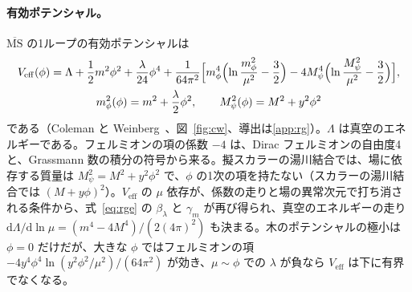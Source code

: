 \documentclass[a4paper,10pt]{ltjsarticle}
\newcommand{\dd}{\mathrm{d}}
\newcommand{\MSbar}{\overline{\mathrm{MS}}}
\begin{document}
\paragraph{有効ポテンシャル。}$\MSbar$ の1ループの有効ポテンシャルは
\begin{equation}
\begin{gathered}
V_{\mathrm{eff}}(\phi)=\Lambda+\frac12m^2\phi^2+\frac{\lambda}{24}\phi^4
+\frac{1}{64\pi^2}\Bigl[m_\phi^4\Bigl(\ln\frac{m_\phi^2}{\mu^2}-\frac32\Bigr)-4M_\psi^4\Bigl(\ln\frac{M_\psi^2}{\mu^2}-\frac32\Bigr)\Bigr],\\
m_\phi^2(\phi)=m^2+\frac{\lambda}{2}\phi^2,\qquad M_\psi^2(\phi)=M^2+y^2\phi^2
\end{gathered}
\label{eq:cw}
\end{equation}
である（Coleman と Weinberg~\cite{cw}、図~\ref{fig:cw}、導出は\ref{app:rg}）。$\Lambda$ は真空のエネルギーである。フェルミオンの項の係数 $-4$ は、Dirac フェルミオンの自由度4と、Grassmann 数の積分の符号から来る。擬スカラーの湯川結合では、場に依存する質量は $M_\psi^2=M^2+y^2\phi^2$ で、$\phi$ の1次の項を持たない（スカラーの湯川結合では $(M+y\phi)^2$）。$V_{\mathrm{eff}}$ の $\mu$ 依存が、係数の走りと場の異常次元で打ち消される条件から、式~\eqref{eq:rge} の $\beta_\lambda$ と $\gamma_m$ が再び得られ、真空のエネルギーの走り $\dd\Lambda/\dd\ln\mu=(m^4-4M^4)/(2(4\pi)^2)$ も決まる。木のポテンシャルの極小は $\phi=0$ だけだが、大きな $\phi$ ではフェルミオンの項 $-4y^4\phi^4\ln(y^2\phi^2/\mu^2)/(64\pi^2)$ が効き、$\mu\sim\phi$ での $\lambda$ が負なら $V_{\mathrm{eff}}$ は下に有界でなくなる。
\end{document}
